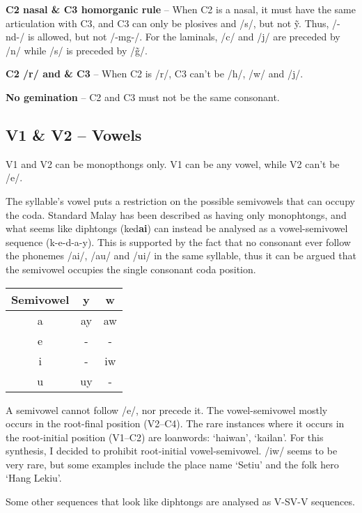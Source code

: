 \documentclass{article}
\begin{document}
\textbf{C2 nasal \& C3 homorganic rule} -- When C2 is a nasal, it must have the same articulation with C3, and C3 can only be plosives and /s/, but not \~y. Thus, /-nd-/ is allowed, but not /-mg-/. For the laminals, /c/ and /j/ are preceded by /n/ while /s/ is preceded by /\~g/.

\textbf{C2 /r/ and \& C3} -- When C2 is /r/, C3 can't be /h/, /w/ and /j/.

\textbf{No gemination} -- C2 and C3 must not be the same consonant.

\subsection*{V1 \& V2 -- Vowels}

V1 and V2 can be monopthongs only. V1 can be any vowel, while V2 can't be /e/.

The syllable's vowel puts a restriction on the possible semivowels that can occupy the coda. Standard Malay has been described as having only monophtongs, and what seems like diphtongs (ked\textbf{ai}) can instead be analysed as a vowel-semivowel sequence (k-e-d-a-y). This is supported by the fact that no consonant ever follow the phonemes /ai/, /au/ and /ui/ in the same syllable, thus it can be argued that the semivowel occupies the single consonant coda position.

\begin{center}
	\begin{tabular}{c c c}
		\toprule
		Semivowel & y  & w  \\ \midrule
		    a     & ay & aw \\
		    e     & -  & -  \\
		    i     & -  & iw \\
		    u     & uy & -  \\ \bottomrule
	\end{tabular}
\end{center}

A semivowel cannot follow /e/, nor precede it. The vowel-semivowel mostly occurs in the root-final position (V2--C4). The rare instances where it occurs in the root-initial position (V1--C2) are loanwords: `haiwan', `kailan'. For this synthesis, I decided to prohibit root-initial vowel-semivowel. /iw/ seems to be very rare, but some examples include the place name `Setiu' and the folk hero `Hang Lekiu'.

Some other sequences that look like diphtongs are analysed as V-SV-V sequences.
\end{document}
